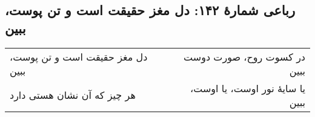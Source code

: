 \begin{center}
\section*{رباعی شمارهٔ ۱۴۲: دل مغز حقیقت است و تن پوست، ببین}
\label{sec:142}
\begin{longtable}{l p{0.5cm} r}
دل مغز حقیقت است و تن پوست، ببین
&&
در کسوت روح، صورت دوست ببین
\\
هر چیز که آن نشان هستی دارد 
&&
یا سایهٔ نور اوست، یا اوست، ببین
\\
\end{longtable}
\end{center}
